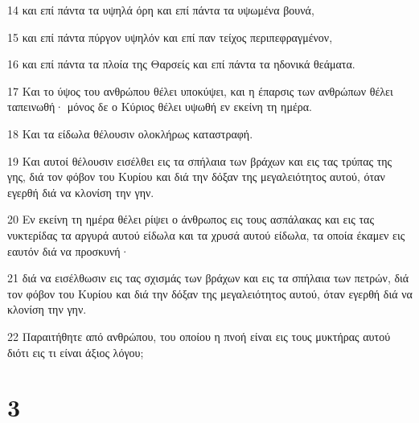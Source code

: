 \par 14 και επί πάντα τα υψηλά όρη και επί πάντα τα υψωμένα βουνά,
\par 15 και επί πάντα πύργον υψηλόν και επί παν τείχος περιπεφραγμένον,
\par 16 και επί πάντα τα πλοία της Θαρσείς και επί πάντα τα ηδονικά θεάματα.
\par 17 Και το ύψος του ανθρώπου θέλει υποκύψει, και η έπαρσις των ανθρώπων θέλει ταπεινωθή· μόνος δε ο Κύριος θέλει υψωθή εν εκείνη τη ημέρα.
\par 18 Και τα είδωλα θέλουσιν ολοκλήρως καταστραφή.
\par 19 Και αυτοί θέλουσιν εισέλθει εις τα σπήλαια των βράχων και εις τας τρύπας της γης, διά τον φόβον του Κυρίου και διά την δόξαν της μεγαλειότητος αυτού, όταν εγερθή διά να κλονίση την γην.
\par 20 Εν εκείνη τη ημέρα θέλει ρίψει ο άνθρωπος εις τους ασπάλακας και εις τας νυκτερίδας τα αργυρά αυτού είδωλα και τα χρυσά αυτού είδωλα, τα οποία έκαμεν εις εαυτόν διά να προσκυνή·
\par 21 διά να εισέλθωσιν εις τας σχισμάς των βράχων και εις τα σπήλαια των πετρών, διά τον φόβον του Κυρίου και διά την δόξαν της μεγαλειότητος αυτού, όταν εγερθή διά να κλονίση την γην.
\par 22 Παραιτήθητε από ανθρώπου, του οποίου η πνοή είναι εις τους μυκτήρας αυτού διότι εις τι είναι άξιος λόγου;

\chapter{3}

